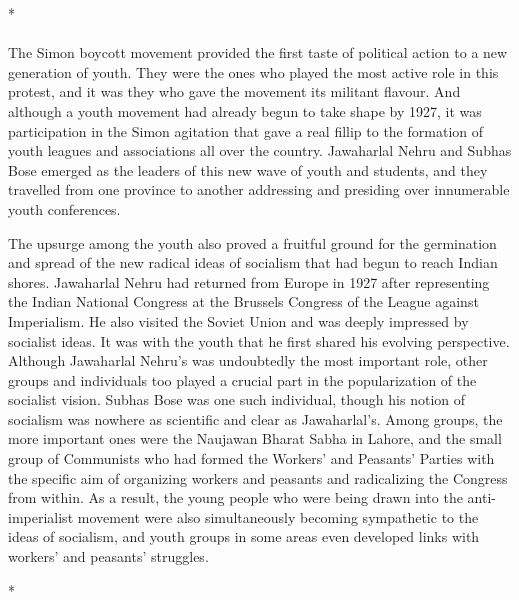 \begin{center}*\end{center}

\paragraph*{}


The Simon boycott movement provided the first taste of political action to a new generation of youth. They were the ones who played the most active role in this protest, and it was they who gave the movement its militant flavour. And although a youth movement had already begun to take shape by 1927, it was participation in the Simon agitation that gave a real fillip to the formation of youth leagues and associations all over the country. Jawaharlal Nehru and Subhas Bose emerged as the leaders of this new wave of youth and students, and they travelled from one province to another addressing and presiding over innumerable youth conferences. 

The upsurge among the youth also proved a fruitful ground for the germination and spread of the new radical ideas of socialism that had begun to reach Indian shores. Jawaharlal Nehru had returned from Europe in 1927 after representing the Indian National Congress at the Brussels Congress of the League against Imperialism. He also visited the Soviet Union and was deeply impressed by socialist ideas. It was with the youth that he first shared his evolving perspective. Although Jawaharlal Nehru's was undoubtedly the most important role, other groups and individuals too played a crucial part in the popularization of the socialist vision. Subhas Bose was one such individual, though his notion of socialism was nowhere as scientific and clear as Jawaharlal's. Among groups, the more important ones were the Naujawan Bharat Sabha in Lahore, and the small group of Communists who had formed the Workers' and Peasants' Parties with the specific aim of organizing workers and peasants and radicalizing the Congress from within. As a result, the young people who were being drawn into the anti-imperialist movement were also simultaneously becoming sympathetic to the ideas of socialism, and youth groups in some areas even developed links with workers' and peasants' struggles.

\begin{center}*\end{center}

\paragraph*{}


